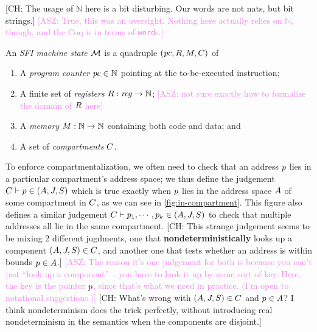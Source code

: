 \documentclass[12pt]{amsart}
\newif\ifdraft\drafttrue
\newcommand{\asz}[1]{\ifdraft\textcolor{violet}{[ASZ: #1]}\fi}
\newcommand*{\term}[1]{\emph{#1}}
\newcommand*{\N}{\mathbb{N}}
\newcommand{\comm}[3]{\ifdraft\textcolor{#1}{[#2: #3]}\fi}
\newcommand{\ch}[1]{\comm{dkgreen}{CH}{#1}} %
\begin{document}
\ch{The usage of $\N$ here is a bit disturbing. Our words are not
  nats, but bit strings.}%
\asz{True, this was an oversight.  Nothing here actually relies on $\N$, though,
  and the Coq is in terms of \texttt{word}s.}

\begin{definition}\label{def:sfi-machine-state}
  An \term{SFI machine state} $\mathcal{M}$ is a quadruple
  $(\mathit{pc},R,M,C)$ of
  \begin{enumerate}
  \item A \term{program counter} $\pc \in \N$ pointing at the to-be-executed
    instruction;
  \item A finite set of \term{registers} $\Registers : \mathit{reg} \to \N$;%
    \asz{not sure exactly how to formalize the domain of $R$ here}
  \item A \term{memory} $\Memory : \N \to \N$ containing both code and data; and
  \item A set of \term{compartments} $C$.
  \end{enumerate}
\end{definition}

To enforce compartmentalization, we often need to check that an address
$p$ lies in a particular compartment's address space; we thus define the
judgement $C \vdash p \in (A, J,
S)$ which is true exactly when $p$ lies in the address space
$A$ of some compartment in $C$, as we can see in
\cref{fig:in-compartment}.  This figure also defines a similar judgement
$C \vdash p_1,\cdots,p_k \in (A,
J, S)$ to check that multiple addresses all lie in the
same compartment.
%
\ch{This strange judgement seems to be mixing 2 different jugdments,
  one that {\bf nondeterministically} looks up a component
  $(A, J, S) \in C$,
  and another one that tests whether an address is within bounds $p
  \in A$.}%
\asz{The reason it's one judgement for both is because you can't just ``look up
  a component'' -- you have to look it up by some sort of key.  Here, the key is
  the pointer $p$, since that's what we need in practice.  (I'm open to
  notational suggestions.)}
%
\ch{What's wrong with $(A, J, S)
  \in C$ and $p \in A$? I think
  nondeterminism does the trick perfectly, without introducing
  real nondeterminism in the semantics when the components are disjoint.}
\end{document}
